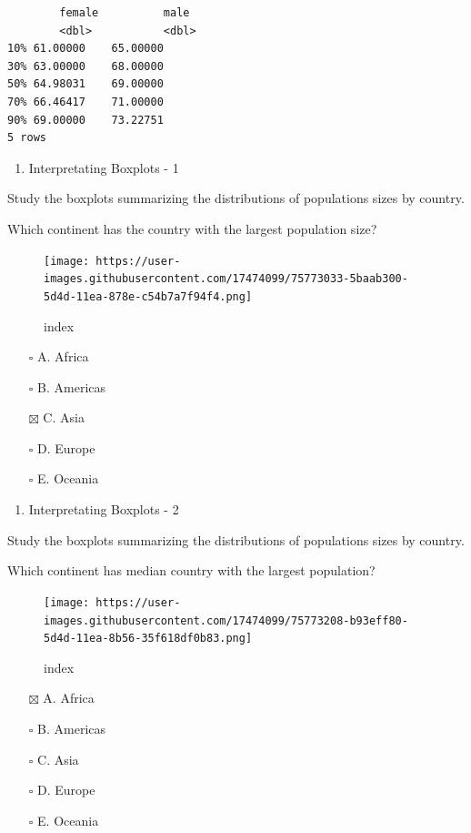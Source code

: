 \documentclass[
]{article}
\providecommand{\tightlist}{%
  \setlength{\itemsep}{0pt}\setlength{\parskip}{0pt}}
\begin{document}
\begin{verbatim}
        female          male
        <dbl>           <dbl>
10% 61.00000    65.00000
30% 63.00000    68.00000
50% 64.98031    69.00000
70% 66.46417    71.00000
90% 69.00000    73.22751
5 rows
\end{verbatim}

\begin{enumerate}
\def\labelenumi{\arabic{enumi}.}
\setcounter{enumi}{2}
\tightlist
\item
  Interpretating Boxplots - 1
\end{enumerate}

Study the boxplots summarizing the distributions of populations sizes by
country.

Which continent has the country with the largest population size?

\begin{figure}
\centering
\texttt{[image: https://user-images.githubusercontent.com/17474099/75773033-5baab300-5d4d-11ea-878e-c54b7a7f94f4.png]}
\caption{index}
\end{figure}

\begin{itemize}
\tightlist
\item[$\square$]
  A. Africa
\item[$\square$]
  B. Americas
\item[$\boxtimes$]
  C. Asia
\item[$\square$]
  D. Europe
\item[$\square$]
  E. Oceania
\end{itemize}

\begin{enumerate}
\def\labelenumi{\arabic{enumi}.}
\setcounter{enumi}{3}
\tightlist
\item
  Interpretating Boxplots - 2
\end{enumerate}

Study the boxplots summarizing the distributions of populations sizes by
country.

Which continent has median country with the largest population?

\begin{figure}
\centering
\texttt{[image: https://user-images.githubusercontent.com/17474099/75773208-b93eff80-5d4d-11ea-8b56-35f618df0b83.png]}
\caption{index}
\end{figure}

\begin{itemize}
\tightlist
\item[$\boxtimes$]
  A. Africa
\item[$\square$]
  B. Americas
\item[$\square$]
  C. Asia
\item[$\square$]
  D. Europe
\item[$\square$]
  E. Oceania
\end{itemize}
\end{document}
